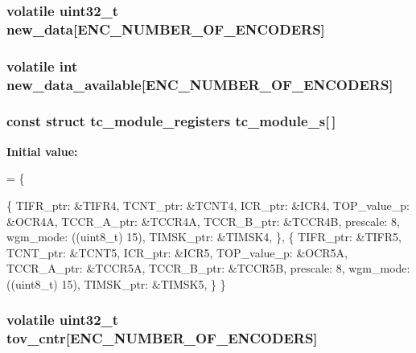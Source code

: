 \subsubsection[{new\+\_\+data}]{\setlength{\rightskip}{0pt plus 5cm}volatile uint32\+\_\+t new\+\_\+data[{\bf E\+N\+C\+\_\+\+N\+U\+M\+B\+E\+R\+\_\+\+O\+F\+\_\+\+E\+N\+C\+O\+D\+E\+RS}]\hspace{0.3cm}{\ttfamily [static]}}\label{motion_8c_a4179ea552e3b15fe63c41656b7abefdd}
\subsubsection[{new\+\_\+data\+\_\+available}]{\setlength{\rightskip}{0pt plus 5cm}volatile int new\+\_\+data\+\_\+available[{\bf E\+N\+C\+\_\+\+N\+U\+M\+B\+E\+R\+\_\+\+O\+F\+\_\+\+E\+N\+C\+O\+D\+E\+RS}]\hspace{0.3cm}{\ttfamily [static]}}\label{motion_8c_a4a8fe84ed65d3237dd67b73a89f1d38f}
\subsubsection[{tc\+\_\+module\+\_\+s}]{\setlength{\rightskip}{0pt plus 5cm}const struct {\bf tc\+\_\+module\+\_\+registers} tc\+\_\+module\+\_\+s[$\,$]\hspace{0.3cm}{\ttfamily [static]}}\label{motion_8c_a101346195b0251159ede2cd50a20f04a}
{\bfseries Initial value\+:}
\begin{DoxyCode}
=
\{
    

    \{   
        TIFR\_ptr:    &TIFR4,
        TCNT\_ptr:    &TCNT4,
        ICR\_ptr:     &ICR4,
        TOP\_value\_p: &OCR4A,
        TCCR\_A\_ptr:  &TCCR4A,
        TCCR\_B\_ptr:  &TCCR4B,
        prescale:    8,
        wgm\_mode:    ((uint8\_t) 15),
        TIMSK\_ptr:   &TIMSK4,
    \},
    \{   
        TIFR\_ptr:    &TIFR5,
        TCNT\_ptr:    &TCNT5,
        ICR\_ptr:     &ICR5,
        TOP\_value\_p: &OCR5A,
        TCCR\_A\_ptr:  &TCCR5A,
        TCCR\_B\_ptr:  &TCCR5B,
        prescale:    8,
        wgm\_mode:    ((uint8\_t) 15),
        TIMSK\_ptr:   &TIMSK5,
    \}
\}
\end{DoxyCode}
\subsubsection[{tov\+\_\+cntr}]{\setlength{\rightskip}{0pt plus 5cm}volatile uint32\+\_\+t tov\+\_\+cntr[{\bf E\+N\+C\+\_\+\+N\+U\+M\+B\+E\+R\+\_\+\+O\+F\+\_\+\+E\+N\+C\+O\+D\+E\+RS}]\hspace{0.3cm}{\ttfamily [static]}}\label{motion_8c_a13e9b849ffe7bd025190fa97cc4856ce}
